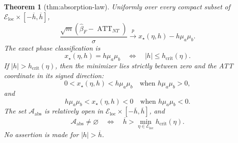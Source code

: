 \documentclass{article}
\newtheorem{theorem}{Theorem}
\begin{document}
\begin{theorem}[thm:absorption-law]\label{thm:absorption-law}
Uniformly over every compact subset of
\(\mathcal E_{\mathrm{loc}}\times[-\overline h,\overline h]\),
\[
\frac{\sqrt m(\widehat\beta_F-\operatorname{ATT}_{NT})}{\sigma}
\xrightarrow{p}x_\star(\eta,h)-h\mu_a\mu_b.
\]
The exact phase classification is
\[
x_\star(\eta,h)=h\mu_a\mu_b
\quad\Longleftrightarrow\quad
|h|\leq h_{\mathrm{crit}}(\eta).
\]
If \(|h|>h_{\mathrm{crit}}(\eta)\), then the minimizer lies strictly between zero and the ATT coordinate in its signed direction:
\[
0<x_\star(\eta,h)<h\mu_a\mu_b
\quad\text{when }h\mu_a\mu_b>0,
\]
and
\[
h\mu_a\mu_b<x_\star(\eta,h)<0
\quad\text{when }h\mu_a\mu_b<0.
\]
The set \(\mathcal A_{\mathrm{abs}}\) is relatively open in
\(\mathcal E_{\mathrm{loc}}\times[-\overline h,\overline h]\), and
\[
\mathcal A_{\mathrm{abs}}\neq\varnothing
\quad\Longleftrightarrow\quad
\overline h>\min_{\eta\in\mathcal E_{\mathrm{loc}}}h_{\mathrm{crit}}(\eta).
\]
No assertion is made for \(|h|>\overline h\).
\end{theorem}
\end{document}
